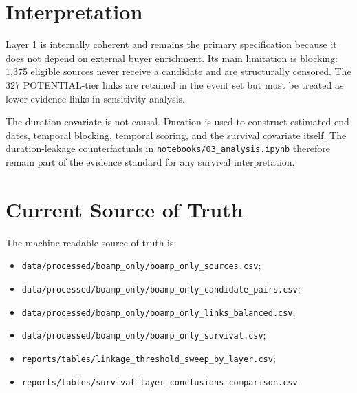 \documentclass[11pt]{article}
\begin{document}
\section{Interpretation}

Layer 1 is internally coherent and remains the primary specification because it
does not depend on external buyer enrichment. Its main limitation is blocking:
1{,}375 eligible sources never receive a candidate and are structurally
censored. The 327 POTENTIAL-tier links are retained in the event set but must be
treated as lower-evidence links in sensitivity analysis.

The duration covariate is not causal. Duration is used to construct estimated
end dates, temporal blocking, temporal scoring, and the survival covariate
itself. The duration-leakage counterfactuals in \texttt{notebooks/03\_analysis.ipynb}
therefore remain part of the evidence standard for any survival interpretation.

\section{Current Source of Truth}

The machine-readable source of truth is:
\begin{itemize}
    \item \texttt{data/processed/boamp\_only/boamp\_only\_sources.csv};
    \item \texttt{data/processed/boamp\_only/boamp\_only\_candidate\_pairs.csv};
    \item \texttt{data/processed/boamp\_only/boamp\_only\_links\_balanced.csv};
    \item \texttt{data/processed/boamp\_only/boamp\_only\_survival.csv};
    \item \texttt{reports/tables/linkage\_threshold\_sweep\_by\_layer.csv};
    \item \texttt{reports/tables/survival\_layer\_conclusions\_comparison.csv}.
\end{itemize}
\end{document}
